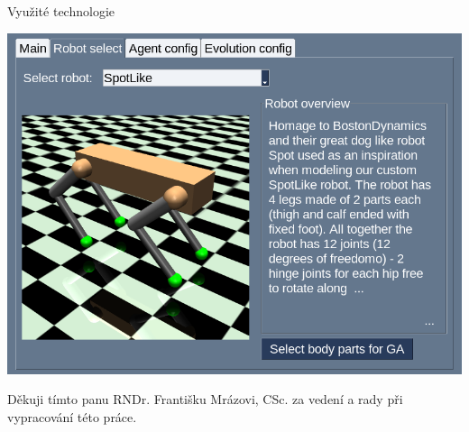 \documentclass[portrait,a0paper,fontscale=0.25]{baposter}
\begin{document}
\begin{poster}
\begin{posterbox}[column=0, name=something1, below=goals]{Využité technologie}
\begin{center}
    \vspace{10px}
\includegraphics[width=0.95\linewidth]{../../BP/img/GUI_robot_tab_spot.jpg}
\end{center}
\end{posterbox}


%
%

\begin{posterbox}[column=0, span=2, name=footer, below=something1,
	textborder=none, headerborder=none, boxheaderheight=0pt,
	boxColorOne=black!3]{}
\small
Děkuji tímto panu RNDr. Františku Mrázovi, CSc. za vedení a rady při
vypracování této práce.
\end{posterbox}

%
%
%


\end{poster}
\end{document}
